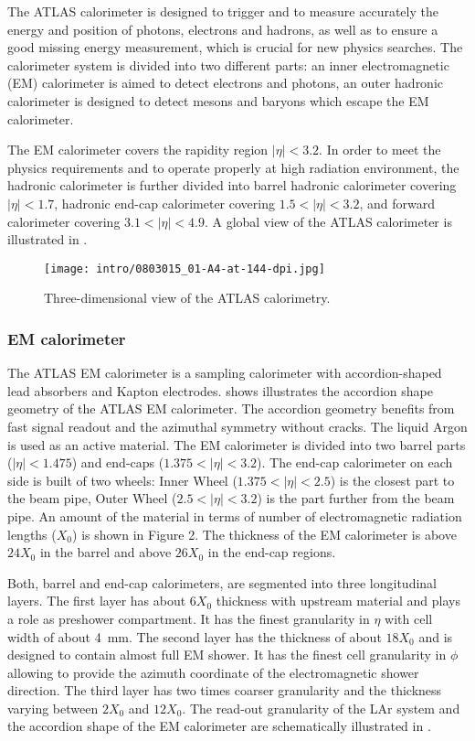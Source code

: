The ATLAS calorimeter is designed to trigger and to measure accurately the energy and position of photons, electrons and hadrons, as well as to ensure a good missing energy measurement, which is crucial for new physics searches. The calorimeter system is divided into two different parts: an inner electromagnetic (EM) calorimeter is aimed to detect electrons and photons, an outer hadronic calorimeter is designed to detect mesons and baryons which escape the EM calorimeter.

The EM calorimeter covers the rapidity region $|\eta| < 3.2$.
In order to meet the physics requirements and to operate properly at high radiation environment, the hadronic calorimeter is further divided into barrel hadronic calorimeter covering $|\eta| < 1.7$, hadronic end-cap calorimeter covering $1.5 < |\eta| < 3.2$, and forward calorimeter covering $3.1 < |\eta| < 4.9$. A global view of the ATLAS calorimeter is illustrated in .

\begin{figure}[h!]
\centering
 \texttt{[image: intro/0803015\_01-A4-at-144-dpi.jpg]}
 \caption{ Three-dimensional view of the ATLAS calorimetry.}
\label{fig:Calo}
\end{figure}

\subsubsection{EM calorimeter}
The ATLAS EM calorimeter is a sampling calorimeter with accordion-shaped lead absorbers and Kapton electrodes.
 shows illustrates the accordion shape geometry of the ATLAS EM calorimeter. The accordion geometry benefits from fast signal readout and the azimuthal symmetry without cracks. The liquid Argon is used as an active material. The EM calorimeter is divided into two barrel parts ($|\eta|<1.475$) and end-caps ($1.375<|\eta|<3.2$).
The end-cap calorimeter on each side is built of two wheels: Inner Wheel ($1.375<|\eta|<2.5$) is the closest part to the beam pipe,
Outer Wheel ($2.5<|\eta|<3.2$) is the part further from the beam pipe.
An amount of the material in terms of number of electromagnetic radiation lengths ($X_0$) is shown in Figure 2.
The thickness of the EM calorimeter is above $24 X_0$ in the barrel and above $26 X_0$ in the end-cap regions.

Both, barrel and end-cap calorimeters, are segmented into three longitudinal layers. The first layer has about $6 X_0$ thickness with upstream material and plays a role as preshower compartment. It has the finest granularity in $\eta$ with cell width of about 4~mm. The second layer has the thickness of about $18 X_0$ and is designed to contain almost full EM shower. It has the finest cell granularity in $\phi$ allowing to provide the azimuth coordinate of the electromagnetic shower direction. The third layer has two times coarser granularity and the thickness varying between $2 X_0$ and $12 X_0$. The read-out granularity of the LAr system and the accordion shape of the EM calorimeter are schematically illustrated in .

